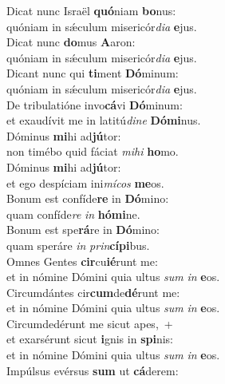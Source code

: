 \evenverse Dicat nunc Israël \textbf{quó}niam \textbf{bo}nus:~\*\\
\evenverse quóniam in sǽculum misericór\textit{di}\textit{a} \textbf{e}jus.\\
\oddverse Dicat nunc \textbf{do}mus \textbf{A}aron:~\*\\
\oddverse quóniam in sǽculum misericór\textit{di}\textit{a} \textbf{e}jus.\\
\evenverse Dicant nunc qui \textbf{ti}ment \textbf{Dó}minum:~\*\\
\evenverse quóniam in sǽculum misericór\textit{di}\textit{a} \textbf{e}jus.\\
\oddverse De tribulatióne invo\textbf{cá}vi \textbf{Dó}minum:~\*\\
\oddverse et exaudívit me in latitú\textit{di}\textit{ne} \textbf{Dó}\textbf{mi}nus.\\
\evenverse Dóminus \textbf{mi}hi ad\textbf{jú}tor:~\*\\
\evenverse non timébo quid fáciat \textit{mi}\textit{hi} \textbf{ho}mo.\\
\oddverse Dóminus \textbf{mi}hi ad\textbf{jú}tor:~\*\\
\oddverse et ego despíciam ini\textit{mí}\textit{cos} \textbf{me}os.\\
\evenverse Bonum est confíde\textbf{re} in \textbf{Dó}mino:~\*\\
\evenverse quam confíde\textit{re} \textit{in} \textbf{hó}\textbf{mi}ne.\\
\oddverse Bonum est spe\textbf{rá}re in \textbf{Dó}mino:~\*\\
\oddverse quam speráre \textit{in} \textit{prin}\textbf{cí}\textbf{pi}bus.\\
\evenverse Omnes Gentes \textbf{cir}cu\textbf{ié}runt me:~\*\\
\evenverse et in nómine Dómini quia ultus \textit{sum} \textit{in} \textbf{e}os.\\
\oddverse Circumdántes cir\textbf{cum}de\textbf{dé}runt me:~\*\\
\oddverse et in nómine Dómini quia ultus \textit{sum} \textit{in} \textbf{e}os.\\
\evenverse Circumdedérunt me sicut apes,~+\\
\evenverse  et exarsérunt sicut \textbf{i}gnis in \textbf{spi}nis:~\*\\
\evenverse et in nómine Dómini quia ultus \textit{sum} \textit{in} \textbf{e}os.\\
\oddverse Impúlsus evérsus \textbf{sum} ut \textbf{cá}derem:~\*\\

